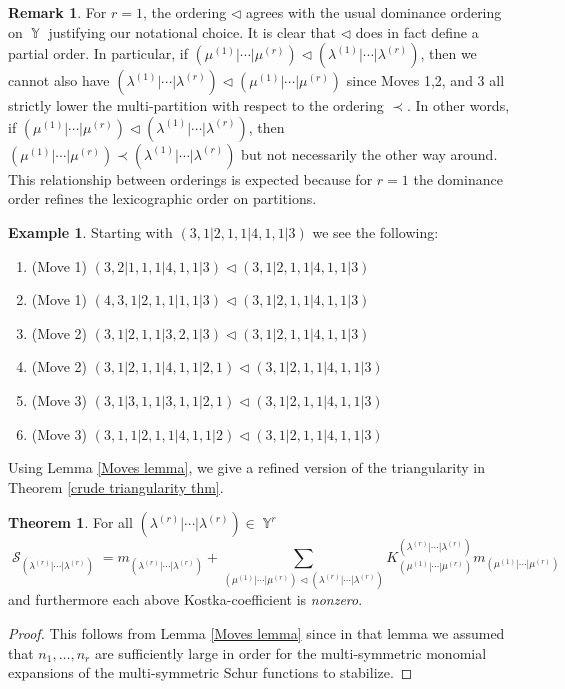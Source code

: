\documentclass[12pt,reqno]{amsart}
\theoremstyle{definition}
\newtheorem{thm}{Theorem}[section]
\newtheorem{remark}{Remark}
\newtheorem{example}{Example}
\DeclareMathOperator{\Par}{\mathbb{Y}}
\DeclareMathOperator{\cS}{\mathcal{S}}
\begin{document}
\begin{remark}
    For $r = 1$, the ordering $\triangleleft$ agrees with the usual dominance ordering on $\Par$ justifying our notational choice. It is clear that $\triangleleft$ does in fact define a partial order. In particular, if $(\mu^{(1)}|\cdots | \mu^{(r)}) \triangleleft (\lambda^{(1)}|\cdots | \lambda^{(r)})$, then we cannot also have $ (\lambda^{(1)}|\cdots | \lambda^{(r)}) \triangleleft (\mu^{(1)}|\cdots | \mu^{(r)})$ since Moves 1,2, and 3 all strictly lower the multi-partition with respect to the ordering $\prec.$ In other words, if $(\mu^{(1)}|\cdots | \mu^{(r)}) \triangleleft (\lambda^{(1)}|\cdots | \lambda^{(r)})$, then $(\mu^{(1)}|\cdots | \mu^{(r)}) \prec (\lambda^{(1)}|\cdots | \lambda^{(r)})$ but not necessarily the other way around. This relationship between orderings is expected because for $r =1$ the dominance order refines the lexicographic order on partitions.
\end{remark}


\begin{example}
    Starting with $(3,1|2,1,1|4,1,1|3)$ we see the following:
    \begin{enumerate}
        \item (Move 1) $(3,2|1,1,1|4,1,1|3) \triangleleft (3,1|2,1,1|4,1,1|3)$ 
        \item (Move 1) $(4,3,1|2,1,1|1,1|3) \triangleleft (3,1|2,1,1|4,1,1|3)$ 
        \item (Move 2) $(3,1|2,1,1|3,2,1|3) \triangleleft (3,1|2,1,1|4,1,1|3)$ 
        \item (Move 2) $(3,1|2,1,1|4,1,1|2,1) \triangleleft (3,1|2,1,1|4,1,1|3)$ 
        \item (Move 3) $(3,1|3,1,1|3,1,1|2,1) \triangleleft (3,1|2,1,1|4,1,1|3)$ 
        \item (Move 3) $(3,1,1|2,1,1|4,1,1|2) \triangleleft (3,1|2,1,1|4,1,1|3)$ 
    \end{enumerate}
\end{example}


Using Lemma \ref{Moves lemma}, we give a refined version of the triangularity in Theorem \ref{crude triangularity thm}.


\begin{thm}\label{complete support of multi-sym Schur}
For all $(\lambda^{(r)}|\cdots | \lambda^{(r)}) \in \Par^r$ 
$$\cS_{(\lambda^{(r)}|\cdots | \lambda^{(r)})} = m_{(\lambda^{(r)}|\cdots | \lambda^{(r)})} + \sum_{(\mu^{(1)}|\cdots | \mu^{(r)})\triangleleft (\lambda^{(r)}|\cdots | \lambda^{(r)})} K_{(\mu^{(1)}|\cdots | \mu^{(r)})}^{(\lambda^{(r)}|\cdots | \lambda^{(r)})} m_{(\mu^{(1)}|\cdots | \mu^{(r)})} $$ and furthermore each above Kostka-coefficient is \textit{nonzero}.
\end{thm}
\begin{proof}
  This follows from Lemma \ref{Moves lemma} since in that lemma we assumed that $n_1,\ldots,n_r$ are sufficiently large in order for the multi-symmetric monomial expansions of the multi-symmetric Schur functions to stabilize.
\end{proof}
\end{document}
